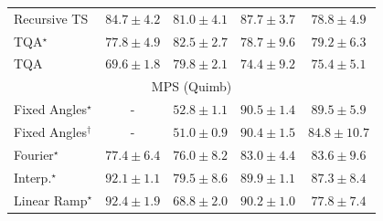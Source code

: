 \begin{tabular}{l|cccc|}
Recursive TS & {\cellcolor[HTML]{852F91}} \color[HTML]{F1F1F1} $84.7\pm 4.2$ & {\cellcolor[HTML]{894FA3}} \color[HTML]{F1F1F1} $81.0\pm 4.1$ & {\cellcolor[HTML]{81127E}} \color[HTML]{F1F1F1} $87.7\pm 3.7$ & {\cellcolor[HTML]{8B61AC}} \color[HTML]{F1F1F1} $78.8\pm 4.9$ \\
TQA$^\star$ & {\cellcolor[HTML]{8C69B0}} \color[HTML]{F1F1F1} $77.8\pm 4.9$ & {\cellcolor[HTML]{88439E}} \color[HTML]{F1F1F1} $82.5\pm 2.7$ & {\cellcolor[HTML]{8B61AC}} \color[HTML]{F1F1F1} $78.7\pm 9.6$ & {\cellcolor[HTML]{8B5DAA}} \color[HTML]{F1F1F1} $79.2\pm 6.3$ \\
TQA & {\cellcolor[HTML]{95A8D0}} \color[HTML]{F1F1F1} $69.6\pm 1.8$ & {\cellcolor[HTML]{8A59A8}} \color[HTML]{F1F1F1} $79.8\pm 2.1$ & {\cellcolor[HTML]{8C84BD}} \color[HTML]{F1F1F1} $74.4\pm 9.2$ & {\cellcolor[HTML]{8C7CB9}} \color[HTML]{F1F1F1} $75.4\pm 5.1$ \\
\cline{1-5}
\multicolumn{5}{c}{\rule{0pt}{8pt}MPS (Quimb)} \\
\midrule
Fixed Angles$^\star$ & {\cellcolor[HTML]{000000}} \color[HTML]{F1F1F1} {\cellcolor{white}} \color{black} - & {\cellcolor[HTML]{FFFCD8}} \color[HTML]{000000} $52.8\pm 1.1$ & {\cellcolor[HTML]{812D05}} \color[HTML]{F1F1F1} $90.5\pm 1.4$ & {\cellcolor[HTML]{8B3005}} \color[HTML]{F1F1F1} $89.5\pm 5.9$ \\
Fixed Angles$^\dagger$ & {\cellcolor[HTML]{000000}} \color[HTML]{F1F1F1} {\cellcolor{white}} \color{black} - & {\cellcolor[HTML]{FFFFE5}} \color[HTML]{000000} $51.0\pm 0.9$ & {\cellcolor[HTML]{832D05}} \color[HTML]{F1F1F1} $90.4\pm 1.5$ & {\cellcolor[HTML]{B84203}} \color[HTML]{F1F1F1} $84.8\pm 10.7$ \\
Fourier$^\star$ & {\cellcolor[HTML]{EC7014}} \color[HTML]{F1F1F1} $77.4\pm 6.4$ & {\cellcolor[HTML]{F17C1A}} \color[HTML]{F1F1F1} $76.0\pm 8.2$ & {\cellcolor[HTML]{C94B02}} \color[HTML]{F1F1F1} $83.0\pm 4.4$ & {\cellcolor[HTML]{C44802}} \color[HTML]{F1F1F1} $83.6\pm 9.6$ \\
Interp.$^\star$ & {\cellcolor[HTML]{712806}} \color[HTML]{F1F1F1} $92.1\pm 1.1$ & {\cellcolor[HTML]{DF620D}} \color[HTML]{F1F1F1} $79.5\pm 8.6$ & {\cellcolor[HTML]{882F05}} \color[HTML]{F1F1F1} $89.9\pm 1.1$ & {\cellcolor[HTML]{A03704}} \color[HTML]{F1F1F1} $87.3\pm 8.4$ \\
Linear Ramp$^\star$ & {\cellcolor[HTML]{702806}} \color[HTML]{F1F1F1} $92.4\pm 1.9$ & {\cellcolor[HTML]{FEB541}} \color[HTML]{000000} $68.8\pm 2.0$ & {\cellcolor[HTML]{842E05}} \color[HTML]{F1F1F1} $90.2\pm 1.0$ & {\cellcolor[HTML]{EA6E13}} \color[HTML]{F1F1F1} $77.8\pm 7.4$ \\

\end{tabular}
